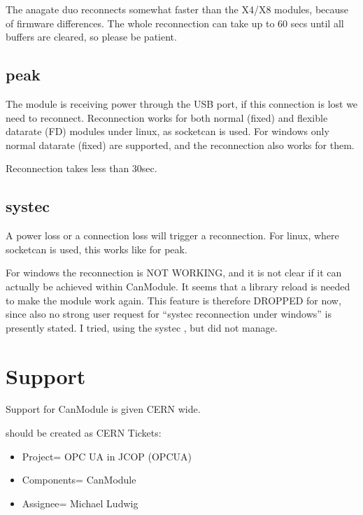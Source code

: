 \documentclass[letterpaper,10pt,english]{sphinxmanual}
\begin{document}
The anagate duo reconnects somewhat faster than the X4/X8 modules, because of firmware differences.
The whole reconnection can take up to 60 secs until all buffers are cleared, so please be patient.


\section{peak}
\label{\detokenize{connection:peak}}
The module is receiving power through the USB port, if this connection is lost we need to reconnect.
Reconnection works for both normal (fixed) and flexible datarate (FD) modules under linux, as
socketcan is used. For windows only
normal datarate (fixed) are supported, and the reconnection also works for them.

Reconnection takes less than 30sec.


\section{systec}
\label{\detokenize{connection:systec}}
A power loss or a connection loss will trigger a reconnection. For linux, where socketcan is used,
this works like for peak.

For windows the reconnection is NOT WORKING, and it is not clear if it can actually
be achieved within CanModule. It seems that a library reload is needed to make the module work again.
This feature is therefore DROPPED for now, since also no strong user request for “systec reconnection
under windows” is presently stated. I tried, using the systec , but did not manage.


\chapter{Support}
\label{\detokenize{support:support}}\label{\detokenize{support::doc}}
Support for CanModule is given CERN wide.

 should be created as CERN  Tickets:
\begin{itemize}
\item {} 
Project= OPC UA in JCOP (OPCUA)

\item {} 
Components= CanModule

\item {} 
Assignee= Michael Ludwig

\end{itemize}
\end{document}
